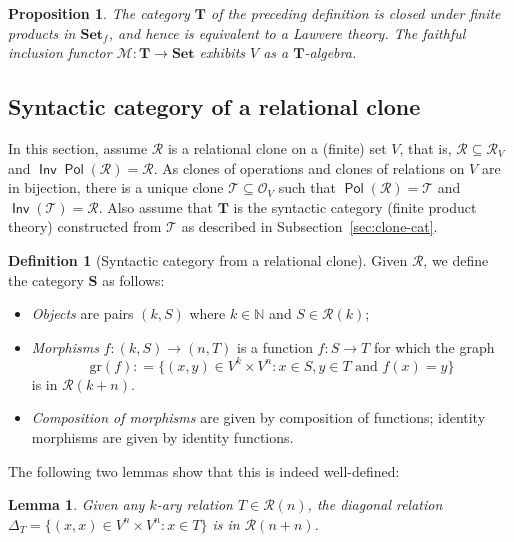 \documentclass[11pt, a4paper, twoside,leqno]{amsart}
\newcommand{\cat}[1]{\mathbf{#1}}
\newcommand{\defeq}{\mathrel{\mathop:}=}
\newcommand{\M}{{\mathcal M}}
\renewcommand{\O}{{\mathcal O}}
\newcommand{\R}{{\mathcal R}}
\numberwithin{equation}{section}
\theoremstyle{plain}
\newtheorem{Prop}[Thm]{Proposition}
\newtheorem{Lemma}[Thm]{Lemma}
\theoremstyle{definition}
\newtheorem{Defn}[Thm]{Definition}
\DeclareMathOperator{\Pol}{\mathsf{Pol}}
\DeclareMathOperator{\Inv}{\mathsf{Inv}}
\begin{document}
\begin{Prop}
  \label{prop:cc-cat}
  The category $\cat{T}$ of the preceding definition is 
  closed under finite products in $\cat{Set}_f$, and hence is
  equivalent to a
  Lawvere theory. The faithful inclusion functor $\M \colon \cat{T}
  \rightarrow \cat{Set}$ exhibits $V$ as a $\cat{T}$-algebra.
\end{Prop}


\subsection{Syntactic category of a relational clone}
\label{sec:coclone-to-clone}

In this section, assume \(\mathscr{R} 
\) is a relational clone on a
(finite) set \(V\), that
is, \(\mathscr{R} \subseteq \R_{V}
\) and \(\Inv\Pol(\mathscr{R}
) = \mathscr{R}
\).  As clones of operations and clones of relations on \(V\) are in bijection,
there is a unique clone \(\mathscr{T}
\subseteq \O_{V}
\) such that \(\Pol(\mathscr{R}
) = \mathscr{T}
\) and \(\Inv(\mathscr{T}
) = \mathscr{R}
\). Also assume that \(\cat{T}\) is the syntactic category (finite product
theory) constructed from \(\mathscr{T}
\) as described in Subsection~\ref{sec:clone-cat}. 

\begin{Defn}[Syntactic category from a relational clone]
  \label{def:syn-cat-cc}
  Given \(\mathscr{R}\), we define the category \(\cat{S}\) as follows:
  \begin{itemize}
  \item \emph{Objects} are pairs $(k, S)$ where $k \in
    \mathbb{N}$ and $S \in \mathscr{R}(k)$;

  \item \emph{Morphisms} $f \colon (k,S)
    \rightarrow (n,T)$ is a function $f \colon S \rightarrow T$ for
    which the graph \[\mathrm{gr}(f) \defeq \{(x, y) \in V^{k} \times V^n : x \in S,
      y \in T \text{ and } f(x) = y\}\] is in $\mathscr{R}(k+n)$.
    
  \item \emph{Composition of morphisms} are given by
    composition of functions; identity morphisms are given by
    identity functions.
  \end{itemize}
\end{Defn}

The following two lemmas show that this is
indeed well-defined:

\begin{Lemma}
  \label{lem:diag-rel}
  Given any \(k\)-ary relation \(T \in \mathscr{R}(n)\), the diagonal
  relation $\Delta_T = \{(x,x) \in V^n \times V^n : x \in
  T\}$ is in $\mathscr{R}(n+n)$.
\end{Lemma}
\end{document}
